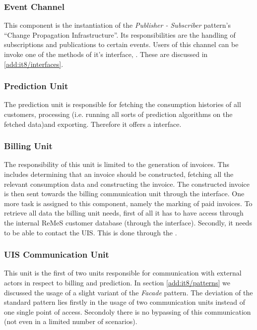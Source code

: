 \subsubsection{Event Channel}

\npar This component is the instantiation of the \emph{Publisher - Subscriber}
pattern's ``Change Propagation Infrastructure''. Its responsibilities are the
handling of subscriptions and publications to certain events. Users of this
channel can be invoke one of the methods of it's interface,
. These are discussed in \ref{add:it8/interfaces}.

\subsubsection{Prediction Unit}

\npar The prediction unit is responsible for fetching the consumption
histories of all customers, processing (i.e. running all sorts of
prediction algorithms on the fetched data)and exporting. Therefore it offers a
 interface.

\subsubsection{Billing Unit}

\npar The responsibility of this unit is limited to the generation of invoices.
Ths includes determining that an invoice should be constructed, fetching all the
relevant consumption data and constructing the invoice. The constructed invoice
is then sent towards the billing communication unit through the
 interface. One more task is assigned to this
component, namely the marking of paid invoices. To retrieve all data the
billing unit needs, first of all it has to have access through the internal
ReMeS customer database (through the  interface).
Secondly, it needs to be able to contact the UIS. This is done through the
.

\subsubsection{UIS Communication Unit}

\npar This unit is the first of two units responsible for communication with
external actors in respect to billing and prediction. In section
\ref{add:it8/patterns} we discussed the usage of a slight variant of the
\emph{Facade} pattern. The deviation of the standard pattern lies firstly in the
usage of two communication units instead of one single point of access.
Secondoly there is no bypassing of this communication (not even in a limited
number of scenarios).

